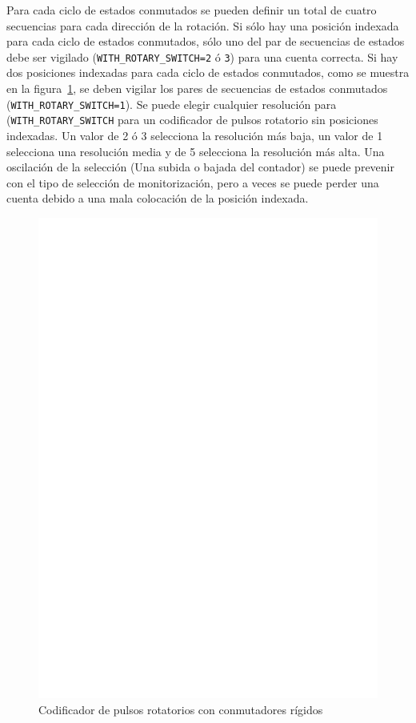 Para cada  ciclo de  estados conmutados  se pueden  definir un total  de cuatro  secuencias para  cada dirección  de la
rotación. Si sólo hay una posición indexada para cada ciclo de estados conmutados, sólo uno del par de secuencias de
estados  debe  ser vigilado  (\texttt{WITH\_ROTARY\_SWITCH=2}  ó  \texttt{3}) para  una  cuenta  correcta. Si  hay  dos
posiciones indexadas para cada  ciclo de estados conmutados, como se muestra en  la figura~\ref{fig:RotBounce}, se deben
vigilar  los pares  de secuencias  de estados  conmutados (\texttt{WITH\_ROTARY\_SWITCH=1}).  Se puede  elegir cualquier
resolución para  (\texttt{WITH\_ROTARY\_SWITCH} para un  codificador de pulsos  rotatorio sin posiciones  indexadas. Un
valor de 2 ó 3 selecciona la resolución más baja, un valor de 1 selecciona una resolución media y de 5 selecciona la
resolución más alta. Una oscilación de la selección (Una subida o bajada del contador) se puede prevenir con el tipo
de selección de monitorización, pero a veces se puede perder  una cuenta debido a una mala colocación de la posición
indexada.

\begin{figure}[H]
\centering
\includegraphics[width=14cm]{../FIG/rotary_bouncing.eps}
\caption{Codificador de pulsos rotatorios con conmutadores rígidos}
\label{fig:RotBounce}
\end{figure}

